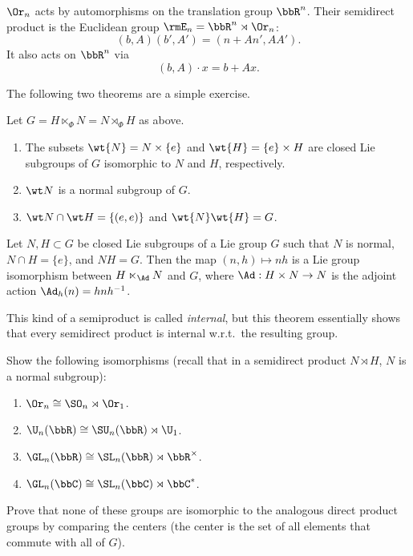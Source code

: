\begin{example}
    $\Or_n$ acts by automorphisms on the translation group $\bbR^n$. Their semidirect product is the Euclidean group $\rmE_n=\bbR^n\rtimes \Or_n$:
    \[(b,A)(b',A')=(n+An',AA').\]
    It also acts on $\bbR^n$ via 
    \[(b,A)\cdot x=b+Ax.\]
\end{example}


The following two theorems are a simple exercise.
\begin{prop}
    Let $G=H\ltimes_\Phi N=N\rtimes_\Phi H$ as above.
    \begin{enumerate}[label=(\alph*)]
        \item The subsets $\wt{N}=N\times\{e\}$ and $\wt{H}=\{e\}\times H$ are closed Lie subgroups of $G$ isomorphic to $N$ and $H$, respectively.
        \item $\wt N$ is a normal subgroup of $G$.
        \item $\wt N\cap \wt H=\{(e,e)\}$ and $\wt{N}\wt{H}=G$.
    \end{enumerate}
\end{prop}

\begin{thm}
    Let $N,H\subset G$ be closed Lie subgroups of a Lie group $G$ such that $N$ is normal, $N\cap H=\{e\}$, and $NH=G$. Then the map $(n,h)\mapsto nh$ is a Lie group isomorphism between $H\ltimes_{\Ad} N$ and $G$, where $\Ad:H\times N\to N$ is the adjoint action $\Ad_h(n)=hnh^{-1}$.
\end{thm}
This kind of a semiproduct is called \emph{internal}, but this theorem essentially shows that every semidirect product is internal w.r.t.\ the resulting group.

\begin{xca}
    Show the following isomorphisms (recall that in a semidirect product $N\rtimes H$, $N$ is a normal subgroup):
    \begin{enumerate}[label=(\alph*)]
        \item $\Or_n\cong \SO_n\rtimes \Or_1$.
        \item $\U_n(\bbR)\cong \SU_n(\bbR)\rtimes \U_1$.
        \item $\GL_n(\bbR)\cong \SL_n(\bbR)\rtimes \bbR^\times$.
        \item $\GL_n(\bbC)\cong \SL_n(\bbC)\rtimes \bbC^\ast$.
    \end{enumerate}
    Prove that none of these groups are isomorphic to the analogous direct product groups by comparing the centers (the center is the set of all elements that commute with all of $G$).
\end{xca}



